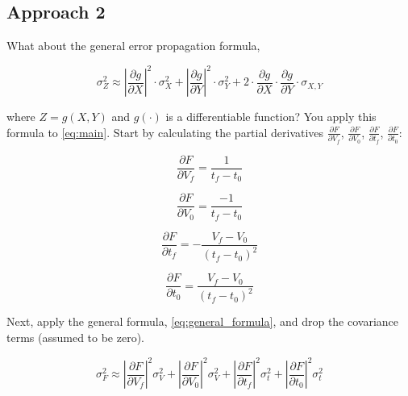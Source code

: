 \documentclass[12pt,twoside]{article}
\newcommand{\fillin}[1]{{\color{white} \large #1}}
\begin{document}
\vspace{0.1\textheight}

\vfill \pagebreak

\subsection{Approach 2}

What about the general error propagation formula,

\begin{equation}
	\sigma_Z^2 \approx \left| \frac{\partial g}{\partial X} \right|^2 \cdot \sigma_X^2 + \left| \frac{\partial g}{\partial Y} \right|^2 \cdot \sigma_Y^2 + 2 \cdot \frac{\partial g}{\partial X} \cdot \frac{\partial g}{\partial Y} \cdot \sigma_{X,Y} \label{eq:general_formula}
\end{equation}

where $Z = g(X,Y)$ and $g(\cdot)$ is a differentiable function? You apply this formula to \eqref{eq:main}. Start by calculating the partial derivatives $\frac{\partial F}{\partial V_{f}}$, $\frac{\partial F}{\partial V_{0}}$, $\frac{\partial F}{\partial t_{f}}$, $\frac{\partial F}{\partial t_{0}}$:

\fillin{

\begin{equation*}
	\frac{\partial F}{\partial V_f} = \frac{1}{t_f - t_{0}}
\end{equation*}

\begin{equation*}
	\frac{\partial F}{\partial V_{0}} = \frac{-1}{t_f - t_{0}}
\end{equation*}

\begin{equation*}
	\frac{\partial F}{\partial t_f} = - \frac{V_f - V_0}{(t_f - t_{0})^2}
\end{equation*}

\begin{equation*}
	\frac{\partial F}{\partial t_{0}} = \frac{V_f - V_{0}}{(t_f - t_{0})^2}
\end{equation*}

}

\vspace{0.05\textheight}

Next, apply the general formula, \eqref{eq:general_formula}, and drop the covariance terms (assumed to be zero).

\begin{equation*}
	\sigma_F^2 \approx \left| \frac{\partial F}{\partial V_{f}} \right|^2 \sigma_V^2 
						+ \left| \frac{\partial F}{\partial V_{0}} \right|^2 \sigma_V^2
						+ \left| \frac{\partial F}{\partial t_f} \right|^2 \sigma_t^2
						+ \left| \frac{\partial F}{\partial t_0} \right|^2 \sigma_t^2
\end{equation*}
\end{document}
